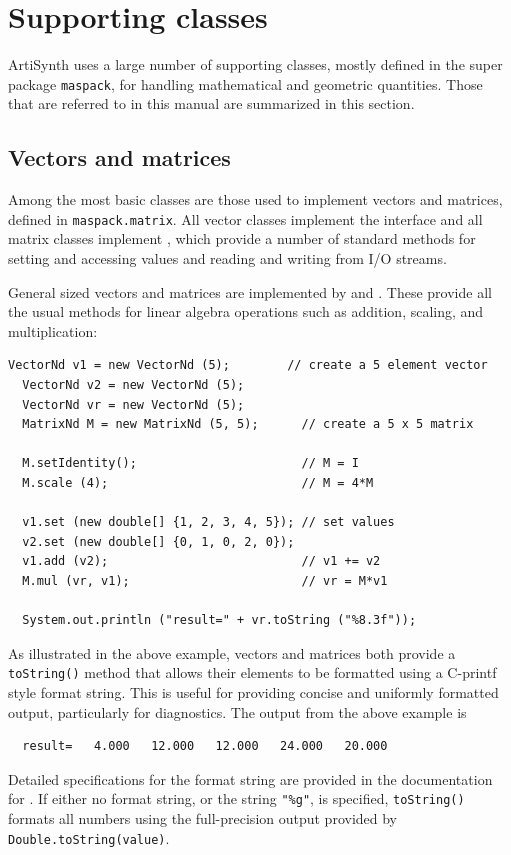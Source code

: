 
\chapter{Supporting classes}

ArtiSynth uses a large number of supporting classes, mostly defined in
the super package {\tt maspack}, for handling mathematical and
geometric quantities. Those that are referred to in this manual are
summarized in this section.

\section{Vectors and matrices}

Among the most basic classes are those used to implement vectors and
matrices, defined in {\tt maspack.matrix}. All vector classes implement
the interface  and all matrix
classes implement , which provide a
number of standard methods for setting and accessing values and
reading and writing from I/O streams. 

General sized vectors and matrices are implemented by
 and
. These provide all the usual
methods for linear algebra operations such as addition, scaling, and
multiplication:
%
\begin{lstlisting}[]
  VectorNd v1 = new VectorNd (5);        // create a 5 element vector
  VectorNd v2 = new VectorNd (5); 
  VectorNd vr = new VectorNd (5); 
  MatrixNd M = new MatrixNd (5, 5);      // create a 5 x 5 matrix

  M.setIdentity();                       // M = I
  M.scale (4);                           // M = 4*M

  v1.set (new double[] {1, 2, 3, 4, 5}); // set values
  v2.set (new double[] {0, 1, 0, 2, 0});
  v1.add (v2);                           // v1 += v2
  M.mul (vr, v1);                        // vr = M*v1

  System.out.println ("result=" + vr.toString ("%8.3f"));
\end{lstlisting}
%
As illustrated in the above example, vectors and matrices both provide
a {\tt toString()} method that allows their elements to be formatted
using a C-printf style format string. This is useful for providing
concise and uniformly formatted output, particularly for diagnostics.
The output from the above example is
%
\begin{verbatim}
  result=   4.000   12.000   12.000   24.000   20.000
\end{verbatim}
%
Detailed specifications for the format string are provided in the
documentation for .
If either no format string, or the string {\tt "\%g"}, is specified,
{\tt toString()} formats all numbers using the full-precision output
provided by {\tt Double.toString(value)}.

